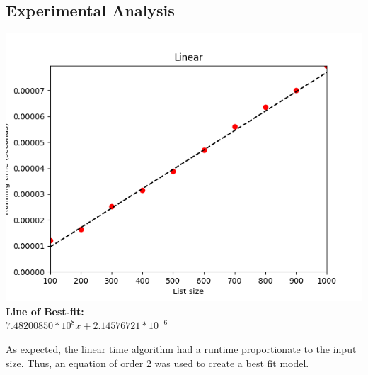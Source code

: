 \documentclass{article}
\begin{document}
  \subsection{Experimental Analysis}
    \includegraphics{linear.png}
    \textbf{Line of Best-fit:}\\
    $7.48200850*10^8x + 2.14576721*10^{-6}$

    As expected, the linear time algorithm had a runtime proportionate to the input size.  Thus, an equation of order 2 was used to create a best fit model.\\
\end{document}
